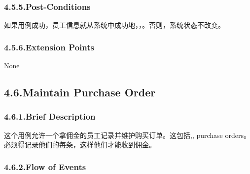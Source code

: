 \documentclass{article}
\begin{document}
\subsubsection{4.5.5.\hspace*{0.5em}Post-Conditions}\label{sec-post-conditions}%

\noindent{}如果用例成功，员工信息就从系统中成功地，，。否则，系统状态不改变。%

\subsubsection{4.5.6.\hspace*{0.5em}Extension Points}\label{sec-extension-points}%

\noindent{}None%

\subsection{4.6.\hspace*{0.5em}Maintain Purchase Order}\label{sec-maintain-purchase-order}%

\subsubsection{4.6.1.\hspace*{0.5em}Brief Description}\label{sec-brief-description}%

\noindent{}这个用例允许一个拿佣金的员工记录并维护购买订单。这包括,, purchase orders。必须得记录他们的每条，这样他们才能收到佣金。%

\subsubsection{4.6.2.\hspace*{0.5em}Flow of Events}\label{sec-flow-of-events}%
\end{document}
